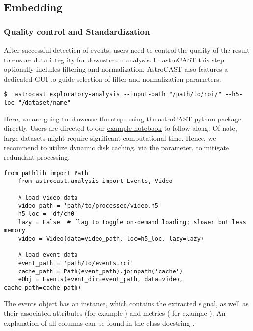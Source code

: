 \subsection{Embedding}\label{subsec:embedding}

\subsubsection{Quality control and Standardization}\label{subsubsec:quality-control}

After successful detection of events, users need to control the quality of the result to ensure data integrity for downstream analysis. In astroCAST this step optionally includes filtering and normalization. AstroCAST also features a dedicated \ac{GUI} to guide selection of filter and normalization parameters.

\begin{lstlisting}[style=bashStyle]
    $  astrocast exploratory-analysis --input-path "/path/to/roi/" --h5-loc "/dataset/name"
\end{lstlisting}

Here, we are going to showcase the steps using the astroCAST python package directly. Users are directed to our \href{https://github.com/janreising/astroCAST/blob/9a474e5a5e643fa886b3edc5237328ca0a1d2a17/notebooks/examples/B%20-%20embedding.ipynb}{example notebook} to follow along. Of note, large datasets might require significant computational time. Hence, we recommend to utilize dynamic disk caching, via the \inlinepy{cache\_path} parameter, to mitigate redundant processing.

\begin{lstlisting}[style=pyStyle]
    from pathlib import Path
    from astrocast.analysis import Events, Video

    # load video data
    video_path = 'path/to/processed/video.h5'
    h5_loc = 'df/ch0'
    lazy = False  # flag to toggle on-demand loading; slower but less memory
    video = Video(data=video_path, loc=h5_loc, lazy=lazy)

    # load event data
    event_path = 'path/to/events.roi'
    cache_path = Path(event_path).joinpath('cache')
    eObj = Events(event_dir=event_path, data=video, cache_path=cache_path)
\end{lstlisting}

The events object has an  instance, which contains the extracted signal, as well as their associated attributes (for example ) and metrics ( for example ). An explanation of all columns can be found in the class docstring .

